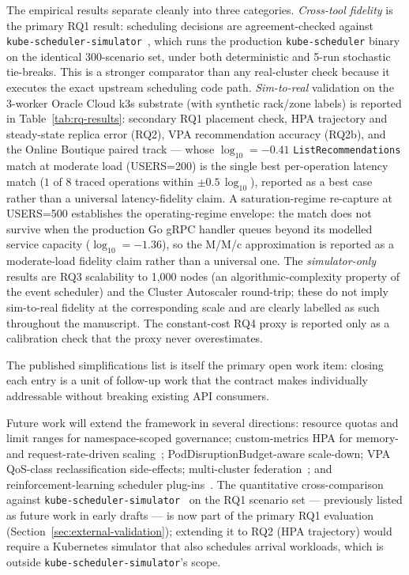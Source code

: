 \documentclass[ASNA,twocolumn]{USG}
\begin{document}
    The empirical results separate cleanly into three categories.
    \emph{Cross-tool fidelity} is the primary RQ1 result: scheduling
    decisions are agreement-checked against
    \texttt{kube-scheduler-simulator}~\cite{KubeSchSim2025}, which runs the
    production \texttt{kube-scheduler} binary on the identical 300-scenario
    set, under both deterministic and 5-run stochastic tie-breaks. This
    is a stronger comparator than any real-cluster check because it
    executes the exact upstream scheduling code path.
    \emph{Sim-to-real} validation on the 3-worker Oracle Cloud k3s
    substrate (with synthetic rack/zone labels) is reported in
    Table~\ref{tab:rq-results}: secondary RQ1 placement check, HPA
    trajectory and steady-state replica error (RQ2), VPA recommendation
    accuracy (RQ2b), and the Online Boutique paired track --- whose
    $\log_{10}=-0.41$ \texttt{ListRecommendations} match at moderate
    load (USERS=200) is the single best per-operation latency match
    ($1$ of $8$ traced operations within $\pm0.5\,\log_{10}$), reported
    as a best case rather than a universal latency-fidelity claim. A
    saturation-regime re-capture at USERS=500 establishes the
    operating-regime envelope: the match does not survive
    when the production Go gRPC handler queues beyond its modelled
    service capacity ($\log_{10} = -1.36$), so the M/M/c approximation
    is reported as a moderate-load fidelity claim rather than a
    universal one. The
    \emph{simulator-only} results are RQ3 scalability to 1{,}000 nodes
    (an algorithmic-complexity property of the event scheduler) and the
    Cluster Autoscaler round-trip; these do not imply sim-to-real
    fidelity at the corresponding scale and are clearly labelled as such
    throughout the manuscript. The constant-cost RQ4 proxy is reported
    only as a calibration check that the proxy never overestimates.

    The published simplifications list is itself the primary open work
    item: closing each entry is a unit of follow-up work that the
    contract makes individually addressable without breaking existing
    API consumers.

    Future work will extend the framework in several directions:
    resource quotas and limit ranges for namespace-scoped governance;
    custom-metrics HPA for memory- and request-rate-driven
    scaling~\cite{Li2023};
    PodDisruptionBudget-aware scale-down;
    VPA QoS-class reclassification side-effects;
    multi-cluster federation~\cite{Karmada2025};
    and reinforcement-learning scheduler plug-ins~\cite{Xie2024,Li2023}.
    The quantitative cross-comparison against
    \texttt{kube-scheduler-simulator}~\cite{KubeSchSim2025} on the RQ1
    scenario set --- previously listed as future work in early drafts ---
    is now part of the primary RQ1 evaluation
    (Section~\ref{sec:external-validation}); extending it to RQ2 (HPA
    trajectory) would require a Kubernetes simulator that also schedules
    arrival workloads, which is outside
    \texttt{kube-scheduler-simulator}'s scope.
\end{document}
